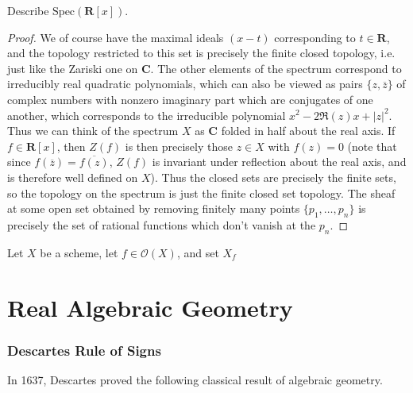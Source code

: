 \begin{theorem}
    Describe $\text{Spec}(\mathbf{R}[x])$.
\end{theorem}
\begin{proof}
    We of course have the maximal ideals $(x - t)$ corresponding to $t \in \mathbf{R}$, and the topology restricted to this set is precisely the finite closed topology, i.e. just like the Zariski one on $\mathbf{C}$. The other elements of the spectrum correspond to irreducibly real quadratic polynomials, which can also be viewed as pairs $\{ z, \overline{z} \}$ of complex numbers with nonzero imaginary part which are conjugates of one another, which corresponds to the irreducible polynomial $x^2 - 2\Re(z)x + |z|^2$. Thus we can think of the spectrum $X$ as $\mathbf{C}$ folded in half about the real axis. If $f \in \mathbf{R}[x]$, then $Z(f)$ is then precisely those $z \in X$ with $f(z) = 0$ (note that since $f(\overline{z}) = \overline{f(z)}$, $Z(f)$ is invariant under reflection about the real axis, and is therefore well defined on $X$). Thus the closed sets are precisely the finite sets, so the topology on the spectrum is just the finite closed set topology. The sheaf at some open set obtained by removing finitely many points $\{ p_1, \dots, p_n \}$ is precisely the set of rational functions which don't vanish at the $p_n$.
\end{proof}

\begin{theorem}
    Let $X$ be a scheme, let $f \in \mathcal{O}(X)$, and set $X_f$
\end{theorem}






\part{Real Algebraic Geometry}

\section{Descartes Rule of Signs}
In 1637, Descartes proved the following classical result of algebraic geometry.

